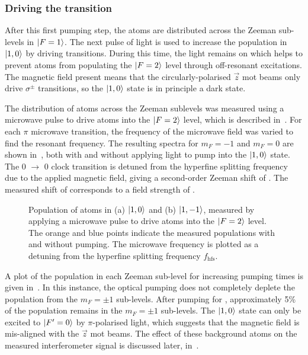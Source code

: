 \subsubsection{Driving the  transition}
After this first pumping step, the atoms are distributed across the Zeeman sub-levels in \(\ket{F=1}\). The next pulse of light is used to increase the population in \(\ket{1,0}\) by driving  transitions. During this time, the  light remains on which helps to prevent atoms from populating the \(\ket{F=2}\) level through off-resonant  excitations. The magnetic field present means that the circularly-polarised \(\vec{z}\) \ac{mot} beams only drive \(\sigma^{\pm}\) transitions, so the \(\ket{1,0}\) state is in principle a dark state. 
\par\noindent
The distribution of atoms across the Zeeman sublevels was measured using a microwave pulse to drive atoms into the \(\ket{F=2}\) level, which is described in~. For each \(\pi\) microwave transition, the frequency of the microwave field was varied to find the resonant frequency. The resulting spectra for \(m_F = -1\)  and \(m_F = 0\) are shown in~, both with and without applying light to pump into the \(\ket{1,0}\) state.  The 0 \(\rightarrow\) 0 clock transition is detuned from the hyperfine splitting frequency due to the applied magnetic field, giving a second-order Zeeman shift of . The measured shift of  corresponds to a field strength of .
\begin{figure}
    \centering
    \def\svgwidth{\columnwidth}
    \caption[\(m_F\) populations before and after  pumping]{Population of atoms in (a) \(\ket{1,0}\) and (b) \(\ket{1,-1}\), measured by applying a  microwave pulse to drive atoms into the \(\ket{F=2}\) level. The orange and blue points indicate the measured populations with and without  pumping. The microwave frequency is plotted as a detuning from the hyperfine splitting frequency \(f_\text{hfs}\).}
    \label{fig:step2_microwave_spec}
\end{figure} 
\par\noindent
A plot of the population in each Zeeman sub-level for increasing pumping times is given in~. In this instance, the optical pumping does not completely deplete the population from the \(m_F = \pm 1\) sub-levels. After pumping for , approximately 5\% of the population remains in the \(m_F = \pm 1\) sub-levels. The \(\ket{1,0}\) state can only be excited to \(\ket{F'=0}\) by \(\pi\)-polarised light, which suggests that the magnetic field is mis-aligned with the \(\vec{z}\) \ac{mot} beams. The effect of these background atoms on the measured interferometer signal is discussed later, in~.
